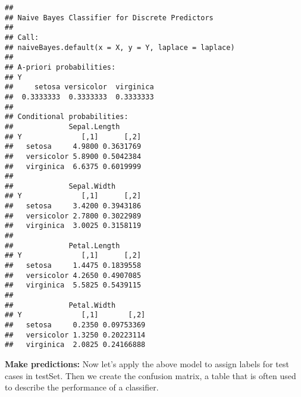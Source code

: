 \documentclass[]{article}
\newenvironment{Shaded}{\begin{snugshade}}{\end{snugshade}}
\newcommand{\CommentTok}[1]{\textcolor[rgb]{0.56,0.35,0.01}{\textit{#1}}}
\newcommand{\DataTypeTok}[1]{\textcolor[rgb]{0.13,0.29,0.53}{#1}}
\newcommand{\KeywordTok}[1]{\textcolor[rgb]{0.13,0.29,0.53}{\textbf{#1}}}
\newcommand{\NormalTok}[1]{#1}
\newcommand{\OperatorTok}[1]{\textcolor[rgb]{0.81,0.36,0.00}{\textbf{#1}}}
\newcommand{\StringTok}[1]{\textcolor[rgb]{0.31,0.60,0.02}{#1}}
\begin{document}
\begin{verbatim}
## 
## Naive Bayes Classifier for Discrete Predictors
## 
## Call:
## naiveBayes.default(x = X, y = Y, laplace = laplace)
## 
## A-priori probabilities:
## Y
##     setosa versicolor  virginica 
##  0.3333333  0.3333333  0.3333333 
## 
## Conditional probabilities:
##             Sepal.Length
## Y              [,1]      [,2]
##   setosa     4.9800 0.3631769
##   versicolor 5.8900 0.5042384
##   virginica  6.6375 0.6019999
## 
##             Sepal.Width
## Y              [,1]      [,2]
##   setosa     3.4200 0.3943186
##   versicolor 2.7800 0.3022989
##   virginica  3.0025 0.3158119
## 
##             Petal.Length
## Y              [,1]      [,2]
##   setosa     1.4475 0.1839558
##   versicolor 4.2650 0.4907085
##   virginica  5.5825 0.5439115
## 
##             Petal.Width
## Y              [,1]       [,2]
##   setosa     0.2350 0.09753369
##   versicolor 1.3250 0.20223114
##   virginica  2.0825 0.24166888
\end{verbatim}

\textbf{Make predictions:} Now let's apply the above model to assign
labels for test cases in testSet. Then we create the confusion matrix, a
table that is often used to describe the performance of a classifier.

\begin{Shaded}
\end{Shaded}
\end{document}
